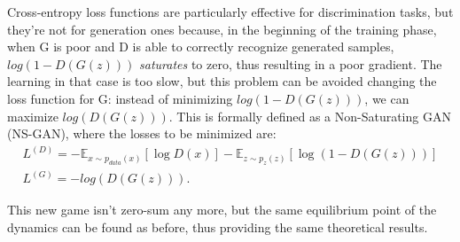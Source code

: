 Cross-entropy loss functions are particularly effective for discrimination tasks, but they're not for generation ones because, in the beginning of the training phase, when G is poor and D is able to correctly recognize generated samples, $log(1-D(G(z)))$ \textit{saturates} to zero, thus resulting in a poor gradient. The learning in that case is too slow, but this problem can be avoided changing the loss function for G: instead of minimizing $log(1-D(G(z)))$, we can maximize $log(D(G(z)))$. This is formally defined as a Non-Saturating GAN (NS-GAN), where the losses to be minimized are:
\begin{align*}
L^{(D)} = -\mathbb{E}_{x \sim p_{data}(x)}[\log D(x)] - \mathbb{E}_{z \sim p_{z}(z)}[\log (1-D(G(z)))]\\
L^{(G)} = - log(D(G(z))).
\end{align*}

This new game isn't zero-sum any more, but the same equilibrium point of the dynamics can be found as before, thus providing the same theoretical results.
